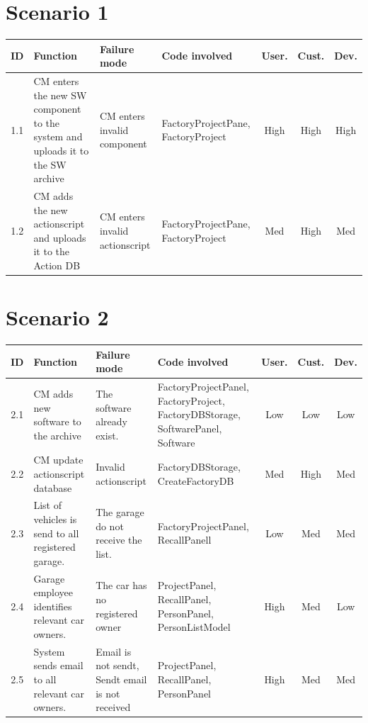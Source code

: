 	\begin{landscape}

	\section{Scenario 1}
			\begin{longtable}{ c | p{5cm} | p{5cm} | p{5cm} | c | c | c}
				\hline
				{\bf ID} & {\bf Function} & {\bf Failure mode} & {\bf Code involved} & 
				{\bf User.} & {\bf Cust.} & {\bf Dev.} \\ \hline
				1.1 
				& CM enters the new SW component to the system and uploads it to the SW archive
				& CM enters invalid component & FactoryProjectPane, FactoryProject
				& High & High & High \\ \hline
				1.2 
				& CM adds the new actionscript and uploads it to the Action DB
				& CM enters invalid actionscript
				& FactoryProjectPane, FactoryProject & Med & High & Med \\ \hline
		\end{longtable}	

	\section{Scenario 2}

			\begin{longtable}{ c | p{5cm} | p{5cm} | p{5cm} | c | c | c}
				\hline
				{\bf ID} & {\bf Function} & {\bf Failure mode} & {\bf Code involved} & 
				{\bf User.} & {\bf Cust.} & {\bf Dev.} \\ \hline
				2.1 
				& CM adds new software to the archive
				& The software already exist. 
				& FactoryProjectPanel, FactoryProject, FactoryDBStorage, SoftwarePanel, Software
				& Low & Low & Low \\ \hline
				2.2 
				& CM update actionscript database
				& Invalid actionscript
				& FactoryDBStorage, CreateFactoryDB
				& Med & High & Med \\ \hline
				2.3
				& List of vehicles is send to all registered garage.
				& The garage do not receive the list.
				& FactoryProjectPanel, RecallPanell
				& Low & Med & Med \\ \hline
				2.4
				& Garage employee identifies relevant car owners.
				& The car has no registered owner
				& ProjectPanel, RecallPanel, PersonPanel, PersonListModel
				& High & Med & Low \\ \hline
				2.5
				& System sends email to all relevant car owners.
				& Email is not sendt, Sendt email is not received
				& ProjectPanel, RecallPanel, PersonPanel
				& High & Med & Med \\ \hline
			

\end{longtable}
\end{landscape}
